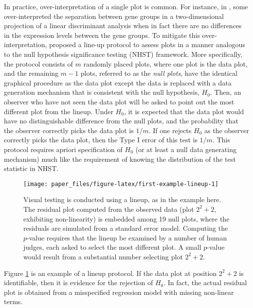 \documentclass[]{interact}
\theoremstyle{plain}%
\theoremstyle{definition}
\theoremstyle{remark}
\begin{document}
In practice, over-interpretation of a single plot is common. For
instance, in \citet{roy_chowdhury_using_2015}, some over-interpreted the
separation between gene groups in a two-dimensional projection of a
linear discriminant analysis when in fact there are no differences in
the expression levels between the gene groups. To mitigate this
over-interpretation, \citet{buja_statistical_2009} proposed a line-up
protocol to assess plots in a manner analogous to the null hypothesis
significance testing (NHST) framework. More specifically, the protocol
consists of \(m\) randomly placed plots, where one plot is the data
plot, and the remaining \(m - 1\) plots, referred to as the \emph{null
plots}, have the identical graphical procedure as the data plot except
the data is replaced with a data generation mechanism that is consistent
with the null hypothesis, \(H_0\). Then, an observer who have not seen
the data plot will be asked to point out the most different plot from
the lineup. Under \(H_0\), it is expected that the data plot would have
no distinguishable difference from the null plots, and the probability
that the observer correctly picks the data plot is \(1/m\). If one
rejects \(H_0\) as the observer correctly picks the data plot, then the
Type I error of this test is \(1/m\). This protocol requires apriori
specification of \(H_0\) (or at least a null data generating mechanism)
much like the requirement of knowing the distribution of the test
statistic in NHST.

\begin{figure}[t!]

{\centering \texttt{[image: paper\_files/figure-latex/first-example-lineup-1]} 

}

\caption{Visual testing is conducted using a lineup, as in the example here. The residual plot computed from the observed data (plot $2^2 + 2$, exhibiting non-linearity) is embedded among 19 null plots, where the residuals are simulated from a standard error model. Computing the $p$-value requires that the lineup be examined by a number of human judges, each asked to select the most different plot. A small $p$-value would result from a substantial number selecting plot $2^2 + 2$.}\label{fig:first-example-lineup}
\end{figure}

Figure \ref{fig:first-example-lineup} is an example of a lineup
protocol. If the data plot at position \(2^2 + 2\) is identifiable, then
it is evidence for the rejection of \(H_0\). In fact, the actual
residual plot is obtained from a misspecified regression model with
missing non-linear terms.
\end{document}
